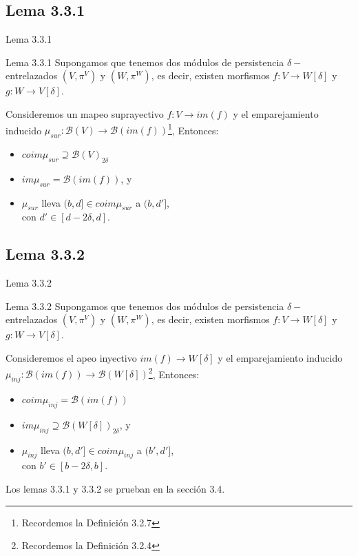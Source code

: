 \documentclass{beamer}
\begin{document}
\subsection{Lema 3.3.1}
\begin{frame}{Lema 3.3.1}
    \begin{block}{Lema 3.3.1}
        Supongamos que tenemos dos módulos de persistencia $\delta-$entrelazados $(V, \pi^V)$ y $(W, \pi^W)$, es decir, existen morfismos $f:V \to W[\delta]$ y $g : W \to V[\delta]$. 
        \newline
        \pause

        Consideremos un mapeo suprayectivo $f:V\to im(f)$  y el emparejamiento inducido $\mu_{sur}:\mathcal{B}(V) \to \mathcal{B}(im (f))$\footnote{Recordemos la Definición 3.2.7}, Entonces:
        \newline
        \pause

        \begin{itemize}
            \item $coim \mu_{sur} \supseteq \mathcal{B}(V)_{2\delta}$
            \item $im \mu_{sur} = \mathcal{B}(im(f))$, y
            \item $\mu_{sur}$ lleva $(b, d] \in coim \mu_{sur}$ a $(b,d']$, \\
            con $d' \in [d - 2\delta, d]$.
        \end{itemize}
    \end{block}

\end{frame}

\subsection{Lema 3.3.2}
\begin{frame}{Lema 3.3.2}
    \begin{block}{Lema 3.3.2}
        Supongamos que tenemos dos módulos de persistencia $\delta-$entrelazados $(V, \pi^V)$ y $(W, \pi^W)$, es decir, existen morfismos $f:V \to W[\delta]$ y $g : W \to V[\delta]$. 
        \newline
        \pause

        Consideremos el apeo inyectivo $im(f)\to W[\delta]$ y el emparejamiento inducido $\mu_{inj}:\mathcal{B}(im (f)) \to \mathcal{B}(W[\delta])$\footnote{Recordemos la Definición 3.2.4}, Entonces:
        \newline
        \pause

        \begin{itemize}
            \item $coim \mu_{inj} = \mathcal{B}(im (f))$
            \item $im \mu_{inj} \supseteq \mathcal{B}(W[\delta])_{2\delta}$, y
            \item $\mu_{inj}$ lleva $(b, d'] \in coim \mu_{inj}$ a $(b',d']$, \\
            con $b' \in [b - 2\delta, b]$.
        \end{itemize}
    \end{block}

    Los lemas 3.3.1 y 3.3.2 se prueban en la sección 3.4. 
\end{frame}
\end{document}
